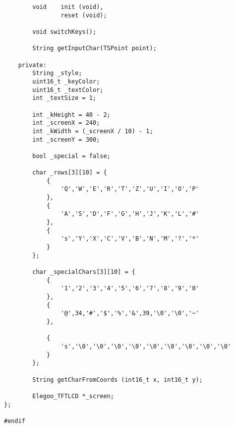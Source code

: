 \documentclass[a4paper, 11pt]{scrartcl}
\begin{document}
\begin{lstlisting}
        void    init (void),
                reset (void);

        void switchKeys();
        
        String getInputChar(TSPoint point);

    private:
        String _style;
        uint16_t _keyColor;
        uint16_t _textColor;
        int _textSize = 1;

        int _kHeight = 40 - 2;
        int _screenX = 240;
        int _kWidth = (_screenX / 10) - 1;
        int _screenY = 300;

        bool _special = false;

        char _rows[3][10] = {
            {
                'Q','W','E','R','T','Z','U','I','O','P'
            },
            {
                'A','S','D','F','G','H','J','K','L','#'
            },
            {
                's','Y','X','C','V','B','N','M','?','*'
            }
        };

        char _specialChars[3][10] = {
            {
                '1','2','3','4','5','6','7','8','9','0'
            },
            {
                '@',34,'#','$','%','&',39,'\0','\0','~'
            },
            
            {
                's','\0','\0','\0','\0','\0','\0','\0','\0','\0'
            }
        };

        String getCharFromCoords (int16_t x, int16_t y);

        Elegoo_TFTLCD *_screen;
};

#endif
\end{lstlisting}
\end{document}
